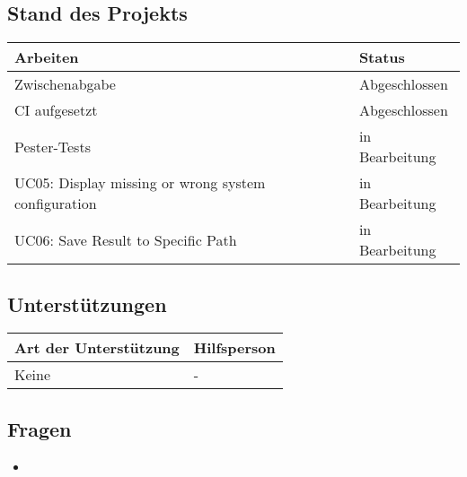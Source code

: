 \subsection*{Stand des Projekts}
\begin{table}[H]
    \centering
    \begin{tabular}{p{12cm} p{4cm}}
        \textbf{Arbeiten} & \textbf{Status} \\ \hline
        Zwischenabgabe & Abgeschlossen \\ \hline
        CI aufgesetzt & Abgeschlossen \\ \hline
        Pester-Tests & in Bearbeitung \\ \hline
        UC05: Display missing or wrong system configuration & in Bearbeitung \\ \hline
        UC06: Save Result to Specific Path & in Bearbeitung \\ \hline
    \end{tabular}
\end{table}

\vspace{1cm}

\subsection*{Unterstützungen}
\begin{table}[H]
    \centering
    \begin{tabular}{p{12cm} p{4cm}}
        \textbf{Art der Unterstützung} & \textbf{Hilfsperson} \\ \hline
        Keine & - \\ \hline
    \end{tabular}
\end{table}

\vspace{1cm}

\subsection*{Fragen}
\begin{itemize}
    \item 
\end{itemize}

\vspace{1cm}

